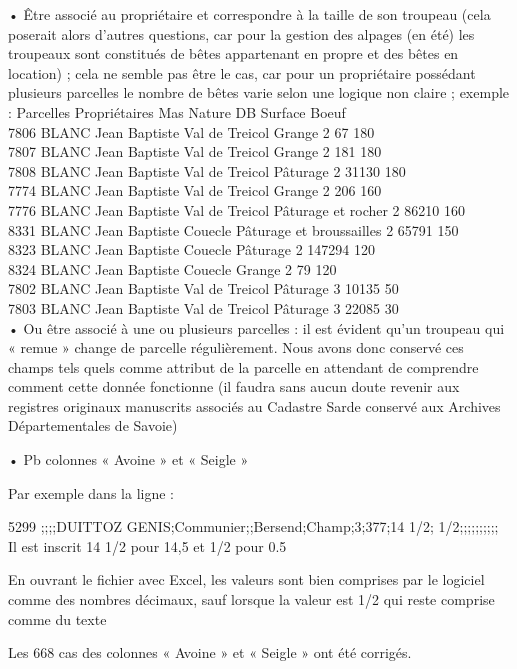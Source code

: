 •	Être associé au propriétaire et correspondre à la taille de son troupeau (cela poserait alors d’autres questions, car pour la gestion des alpages (en été) les troupeaux sont constitués de bêtes appartenant en propre et des bêtes en location) ; cela ne semble pas être le cas, car pour un propriétaire possédant plusieurs parcelles le nombre de bêtes varie selon une logique non claire ; exemple :
Parcelles	Propriétaires	Mas	Nature	DB	Surface	Boeuf\\
7806	BLANC Jean Baptiste	Val de Treicol	Grange	2	67	180\\
7807	BLANC Jean Baptiste	Val de Treicol	Grange	2	181	180\\
7808	BLANC Jean Baptiste	Val de Treicol	Pâturage	2	31130	180\\
7774	BLANC Jean Baptiste	Val de Treicol	Grange	2	206	160\\
7776	BLANC Jean Baptiste	Val de Treicol	Pâturage et rocher	2	86210	160\\
8331	BLANC Jean Baptiste	Couecle	Pâturage et broussailles	2	65791	150\\
8323	BLANC Jean Baptiste	Couecle	Pâturage	2	147294	120\\
8324	BLANC Jean Baptiste	Couecle	Grange	2	79	120\\
7802	BLANC Jean Baptiste	Val de Treicol	Pâturage	3	10135	50\\
7803	BLANC Jean Baptiste	Val de Treicol	Pâturage	3	22085	30\\

•	Ou être associé à une ou plusieurs parcelles : il est évident qu’un troupeau qui « remue » change de parcelle régulièrement.
Nous avons donc conservé ces champs tels quels comme attribut de la parcelle en attendant de comprendre comment cette donnée fonctionne (il faudra sans aucun doute revenir aux registres originaux manuscrits associés au Cadastre Sarde conservé aux Archives Départementales de Savoie)

•	Pb colonnes « Avoine » et « Seigle »

Par exemple dans la ligne :

5299 ;;;;DUITTOZ GENIS;Communier;;Bersend;Champ;3;377;14 1/2; 1/2;;;;;;;;;;\\
Il est inscrit 14 1/2 pour 14,5 et 1/2 pour 0.5

En ouvrant le fichier avec Excel, les valeurs sont bien comprises par le logiciel comme des nombres décimaux, sauf lorsque la valeur est 1/2 qui reste comprise comme du texte

Les 668 cas des colonnes « Avoine » et « Seigle » ont été corrigés.

